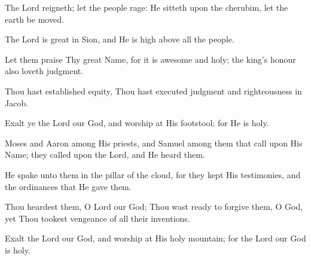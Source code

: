 The Lord reigneth; let the people rage: He sitteth upon the cherubim, let the earth be moved.

The Lord is great in Sion, and He is high above all the people.

Let them praise Thy great Name, for it is awesome and holy; the king's honour also loveth judgment.

Thou hast established equity, Thou hast executed judgment and righteousness in Jacob.

Exalt ye the Lord our God, and worship at His footstool; for He is holy.

Moses and Aaron among His priests, and Samuel among them that call upon His Name; they called upon the Lord, and He heard them.

He spake unto them in the pillar of the cloud, for they kept His testimonies, and the ordinances that He gave them.

Thou heardest them, O Lord our God; Thou wast ready to forgive them, O God, yet Thou tookest vengeance of all their inventions.

Exalt the Lord our God, and worship at His holy mountain; for the Lord our God is holy.

